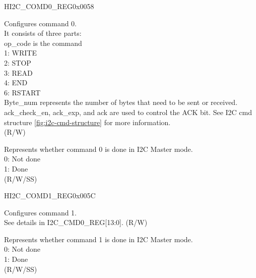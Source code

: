 \begin{register}{H}{I2C\_COMD0\_REG}{0x0058}\label{regdesc:I2CCOMD0REG}
%
%
%
\regnewline%
\begin{regdesc}\begin{reglist}
\label{fielddesc:I2CCOMMAND0}\item [I2C\_COMMAND0] Configures command 0. \\
It consists of three parts:\\
op\_code is the command\\
1: WRITE\\
2: STOP\\
3: READ\\
4: END\\
6: RSTART\\
Byte\_num represents the number of bytes that need to be sent or received.\\
ack\_check\_en, ack\_exp, and ack are used to control the ACK bit. See I2C cmd structure \ref{fig:i2c-cmd-structure} for more information. \\(R/W)
\label{fielddesc:I2CCOMMAND0DONE}\item [I2C\_COMMAND0\_DONE] Represents whether command 0 is done in I2C Master mode.\\
0: Not done \\
1: Done \\ (R/W/SS)
\end{reglist}\end{regdesc}
\end{register}


\begin{register}{H}{I2C\_COMD1\_REG}{0x005C}\label{regdesc:I2CCOMD1REG}
%
%
%
\regnewline%
\begin{regdesc}\begin{reglist}
\label{fielddesc:I2CCOMMAND1}\item [I2C\_COMMAND1] Configures command 1.\\
See details in I2C\_CMD0\_REG[13:0]. (R/W)
\label{fielddesc:I2CCOMMAND1DONE}\item [I2C\_COMMAND1\_DONE] Represents whether command 1 is done in I2C Master mode.\\
0: Not done \\
1: Done \\ (R/W/SS)
\end{reglist}\end{regdesc}
\end{register}


